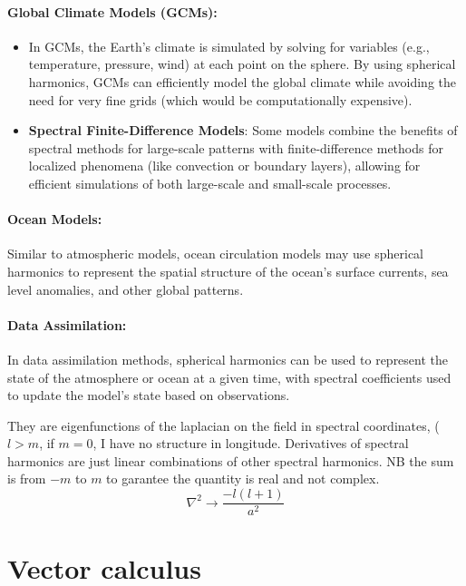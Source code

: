 \paragraph{\textbf{Global Climate Models (GCMs)}:}

\begin{itemize}
	\item In GCMs, the Earth's climate is simulated by solving for variables (e.g., temperature, pressure, wind) at each point on the sphere. By using spherical harmonics, GCMs can efficiently model the global climate while avoiding the need for very fine grids (which would be computationally expensive).
	\item \textbf{Spectral Finite-Difference Models}: Some models combine the benefits of spectral methods for large-scale patterns with finite-difference methods for localized phenomena (like convection or boundary layers), allowing for efficient simulations of both large-scale and small-scale processes.
\end{itemize}

\paragraph{\textbf{Ocean Models}:}

Similar to atmospheric models, ocean circulation models may use spherical harmonics to represent the spatial structure of the ocean's surface currents, sea level anomalies, and other global patterns.

\paragraph{\textbf{Data Assimilation}:}

In data assimilation methods, spherical harmonics can be used to represent the state of the atmosphere or ocean at a given time, with spectral coefficients used to update the model's state based on observations.

They are eigenfunctions of the laplacian on the field in spectral coordinates, ($l>m$, if $m=0$, I have no structure in longitude. Derivatives of spectral harmonics are just linear combinations of other spectral harmonics. NB the sum is from $-m$ to $m$ to garantee the quantity is real and not complex. $$\nabla^2\rightarrow \frac{-l(l+1)}{a^2}$$
\section{Vector calculus}
